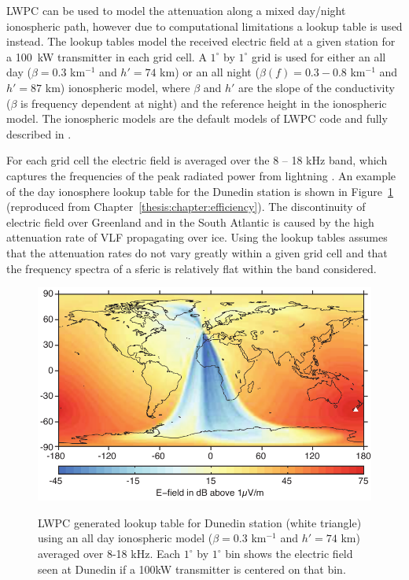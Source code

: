 LWPC can be used to model the attenuation along a mixed day/night ionospheric path, however due to computational limitations a lookup table is used instead.
The lookup tables model the received electric field at a given station for a 100~kW transmitter in each grid cell.
A $1^{\circ}$ by $1^{\circ}$ grid is used for either an all day ($\beta=0.3$ km$^{-1}$ and $h'=74$ km) or an all night ($\beta(f)=0.3-0.8$ km$^{-1}$ and $h'=87$ km) ionospheric model, where $\beta$ and $h'$ are the slope of the conductivity ($\beta$ is frequency dependent at night) and the reference height in the ionospheric model.
The ionospheric models are the default models of LWPC code and fully described in \citet{Ferguson1998}. 

For each grid cell the electric field is averaged over the 8 -- 18 kHz band, which captures the frequencies of the peak radiated power from lightning \citep{Volland1995}.
An example of the day ionosphere lookup table for the Dunedin station is shown in Figure~\ref{intro:fig:lookup} (reproduced from Chapter~\ref{thesis:chapter:efficiency}).
The discontinuity of electric field over Greenland and in the South Atlantic is caused by the high attenuation rate of VLF propagating over ice.
Using the lookup tables assumes that the attenuation rates do not vary greatly within a given grid cell and that the frequency spectra of a sferic is relatively flat within the band considered.

\begin{figure}[ht!]
	\centering
	\includegraphics[scale=1]{Introduction/Figures/lwpc_Lookup.pdf}\\
	\caption{LWPC generated lookup table for Dunedin station (white triangle) using an all day ionospheric model ($	\beta=0.3$ km$^{-1}$ and $h'=74$ km) averaged over 8-18 kHz. Each $1^{\circ}$ by $1^{\circ}$ bin shows the electric field seen at Dunedin if a 100kW transmitter is centered on that bin.}
	\label{intro:fig:lookup}
\end{figure}

